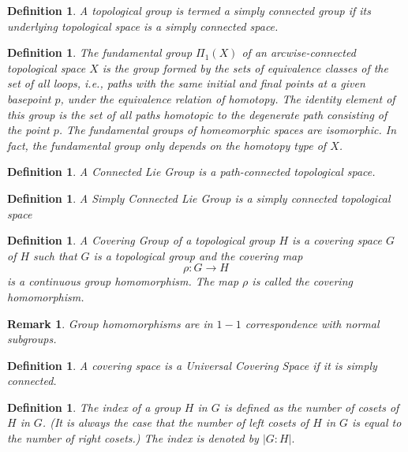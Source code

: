 \documentclass[aps,preprint]{revtex4}%
\newtheorem{definition}[theorem]{Definition}
\newtheorem{remark}[theorem]{Remark}
\begin{document}
\begin{definition}
A topological group is termed a \emph{simply connected group} if its
underlying topological space is a simply connected space.
\end{definition}

\begin{definition}
The \emph{fundamental group} $\Pi_{1}\left(  X\right)  $ of an
\emph{arcwise-connected} topological space $X$ is the \emph{group formed} by
the \emph{sets of equivalence classes} of the \emph{set of all loops}, i.e.,
\emph{paths} with the same initial and final points at a given basepoint $p$,
under the \emph{equivalence relation of homotopy}. The \emph{identity element}
of this group is the set of all \emph{paths homotopic} to the \emph{degenerate
path consisting of the point }$p$. The fundamental groups of homeomorphic
spaces are isomorphic. In fact, the fundamental group only depends on the
\emph{homotopy type} of $X$.
\end{definition}

\begin{definition}
A \emph{Connected Lie Group} is a \emph{path-connected topological space.}
\end{definition}

\begin{definition}
A \emph{Simply Connected} Lie Group is a \emph{simply connected}
\emph{topological space}
\end{definition}

\begin{definition}
A \emph{Covering Group} of a topological group $H$ is a \emph{covering space}
$G$ of $H$ such that $G$ is a topological group and the covering map%
\begin{equation}
\rho:G\rightarrow H
\end{equation}
is a \emph{continuous group homomorphism}. The map $\rho$ is called the
\emph{covering homomorphism}.
\end{definition}

\begin{remark}
Group homomorphisms are in $1-1$ correspondence with \emph{normal} subgroups. 
\end{remark}

\begin{definition}
A covering space is a \emph{Universal Covering Space} if it is simply connected.
\end{definition}

\begin{definition}
The \emph{index} of a group $H$ in $G$ is defined as the number of cosets of
$H$ in $G$. (It is always the case that the number of left cosets of $H$ in
$G$ is equal to the number of right cosets.) The index is denoted by
$\left\vert G:H\right\vert .$
\end{definition}
\end{document}
